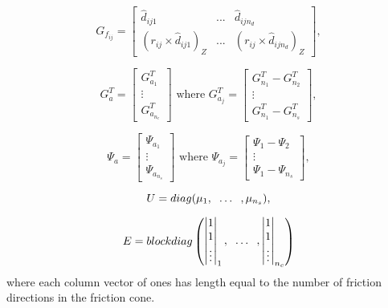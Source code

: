 \documentclass{article}
\begin{document}
\begin{equation}
G_{f_{ij}} = \begin{bmatrix} 
\hat{d}_{ij1} & ... & \hat{d}_{ijn_d} \\
(r_{ij} \times  \hat{d}_{ij1})_Z  & ... & (r_{ij} \times  \hat{d}_{ijn_d})_Z
\end{bmatrix}, 
\nonumber
 \end{equation}

\begin{equation}
 G_{a}^T = \begin{bmatrix} G_{a_1}^T \\  \vdots  \\  G_{a_{n_c}}^T\end{bmatrix}  \nonumber
\text{ where }
 G_{a_j}^T = \begin{bmatrix} G_{n_1}^T - G_{n_2}^T \\  \vdots  \\  G_{n_1}^T  -  G_{n_s}^T \end{bmatrix},
\nonumber
\end{equation}

\begin{equation}
 \Psi_a = \begin{bmatrix} \Psi_{a_1} \\ \vdots \\ \Psi_{a_{n_s}} \end{bmatrix} \text{ where }
 \Psi_{a_j} = \begin{bmatrix} \Psi_1 - \Psi_2 \\ \vdots  \\ \Psi_1 - \Psi_{n_s} \end{bmatrix}, 
\nonumber
\end{equation}

\begin{equation}
U = diag(\mu_{1}, \hspace{2mm} \ldots \hspace{2mm}, \mu_{n_s}  ),  \nonumber
 \end{equation}

\begin{equation}
E = blockdiag
    \begin{pmatrix}
	\begin{vmatrix} 1 \\ 1 \\ \vdots \end{vmatrix}_1 , \hspace{2mm} \ldots \hspace{2mm} , 
	\begin{vmatrix} 1 \\ 1 \\ \vdots \end{vmatrix}_{n_c}  \nonumber 
    \end{pmatrix}
\end{equation}
where each column vector of ones has length equal to the number of friction directions in the friction cone.
\end{document}
